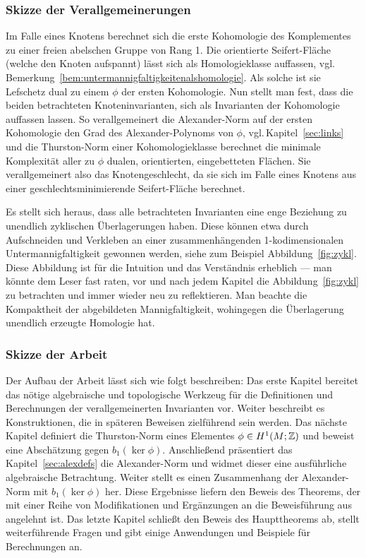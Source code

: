 	\subsubsection*{Skizze der Verallgemeinerungen}
    Im Falle eines Knotens berechnet sich die erste Kohomologie des Komplementes zu einer freien abelschen Gruppe von Rang 1. Die orientierte Seifert-Fläche (welche den Knoten aufspannt) lässt sich als Homologieklasse auffassen, vgl.\,Bemerkung~\ref{bem:untermannigfaltigkeitenalshomologie}. Als solche ist sie Lefschetz dual zu einem $\phi$ der ersten Kohomologie. Nun stellt man fest, dass die beiden betrachteten Knoteninvarianten, sich als Invarianten der Kohomologie auffassen lassen. So verallgemeinert die Alexander-Norm auf der ersten Kohomologie den Grad des Alexander-Polynoms von $\phi$, vgl.\,Kapitel~\ref{sec:links} und die Thurston-Norm einer Kohomologieklasse berechnet die minimale Komplexität aller zu $\phi$ dualen, orientierten, eingebetteten Flächen. Sie verallgemeinert also das Knotengeschlecht, da sie sich im Falle eines Knotens aus einer geschlechtsminimierende Seifert-Fläche berechnet.

    Es stellt sich heraus, dass alle betrachteten Invarianten eine enge Beziehung zu unendlich zyklischen Überlagerungen haben. Diese können etwa durch Aufschneiden und Verkleben an einer zusammenhängenden 1-kodimensionalen Untermannigfaltigkeit gewonnen werden, siehe zum Beispiel Abbildung~\ref{fig:zykl}. Diese Abbildung ist für die Intuition und das Verständnis erheblich --- man könnte dem Leser fast raten, vor und nach jedem Kapitel die Abbildung~\ref{fig:zykl} zu betrachten und immer wieder neu zu reflektieren. Man beachte die Kompaktheit der abgebildeten Mannigfaltigkeit, wohingegen die Überlagerung unendlich erzeugte Homologie hat.

    \subsubsection*{Skizze der Arbeit}
    Der Aufbau der Arbeit lässt sich wie folgt beschreiben: Das erste Kapitel bereitet das nötige algebraische und topologische Werkzeug für die Definitionen und Berechnungen der verallgemeinerten Invarianten vor. Weiter beschreibt es Konstruktionen, die in späteren Beweisen zielführend sein werden. Das nächste Kapitel definiert die Thurston-Norm eines Elementes $\phi \in H^1(M;\mathbb{Z})$ und beweist eine Abschätzung gegen $b_1(\ker\phi)$. Anschließend präsentiert das Kapitel~\ref{sec:alexdefs} die Alexander-Norm und widmet dieser eine ausführliche algebraische Betrachtung. Weiter stellt es einen Zusammenhang der Alexander-Norm mit $b_1(\ker\phi)$ her. Diese Ergebnisse liefern den Beweis des Theorems, der mit einer Reihe von Modifikationen und Ergänzungen an die Beweisführung aus~\cite{MCMULLEN.2002} angelehnt ist. Das letzte Kapitel schließt den Beweis des Haupttheorems ab, stellt weiterführende Fragen und gibt einige Anwendungen und Beispiele für Berechnungen an.   

